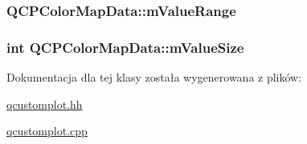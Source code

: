 \subsubsection[{\texorpdfstring{m\+Value\+Range}{mValueRange}}]{ Q\+C\+P\+Color\+Map\+Data\+::m\+Value\+Range\hspace{0.3cm}{\ttfamily [protected]}}\hypertarget{class_q_c_p_color_map_data_a225bb96f10c1a27b51ae59249477dbef}{}\label{class_q_c_p_color_map_data_a225bb96f10c1a27b51ae59249477dbef}
\subsubsection[{\texorpdfstring{m\+Value\+Size}{mValueSize}}]{\setlength{\rightskip}{0pt plus 5cm}int Q\+C\+P\+Color\+Map\+Data\+::m\+Value\+Size\hspace{0.3cm}{\ttfamily [protected]}}\hypertarget{class_q_c_p_color_map_data_ae8ee9093632a59f55eb4fc06579ed256}{}\label{class_q_c_p_color_map_data_ae8ee9093632a59f55eb4fc06579ed256}


Dokumentacja dla tej klasy została wygenerowana z plików\+:\begin{DoxyCompactItemize}
\item 
\hyperlink{qcustomplot_8hh}{qcustomplot.\+hh}\item 
\hyperlink{qcustomplot_8cpp}{qcustomplot.\+cpp}\end{DoxyCompactItemize}
